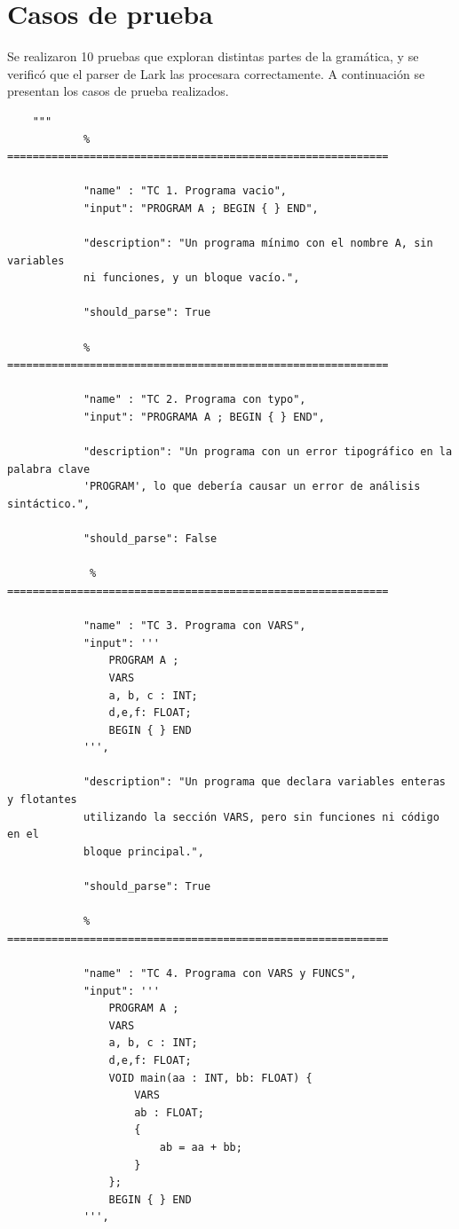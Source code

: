 \documentclass[12pt, letterpaper]{article}
\theoremstyle{definition}
\begin{document}
\section{Casos de prueba}
Se realizaron 10 pruebas que exploran distintas partes de la gramática, y se verificó que el parser de Lark las procesara correctamente. A continuación se presentan los casos de prueba realizados.
\begin{verbatim}
    """ 
            % ============================================================

            "name" : "TC 1. Programa vacio",
            "input": "PROGRAM A ; BEGIN { } END",
           
            "description": "Un programa mínimo con el nombre A, sin variables
            ni funciones, y un bloque vacío.",
           
            "should_parse": True
        
            % ============================================================

            "name" : "TC 2. Programa con typo",
            "input": "PROGRAMA A ; BEGIN { } END",
           
            "description": "Un programa con un error tipográfico en la palabra clave
            'PROGRAM', lo que debería causar un error de análisis sintáctico.",
           
            "should_parse": False
        
             % ============================================================

            "name" : "TC 3. Programa con VARS",
            "input": '''
                PROGRAM A ;
                VARS 
                a, b, c : INT;
                d,e,f: FLOAT;
                BEGIN { } END
            ''',
            
            "description": "Un programa que declara variables enteras y flotantes
            utilizando la sección VARS, pero sin funciones ni código en el
            bloque principal.",
            
            "should_parse": True
     
            % ============================================================

            "name" : "TC 4. Programa con VARS y FUNCS",
            "input": '''
                PROGRAM A ;
                VARS 
                a, b, c : INT;
                d,e,f: FLOAT;
                VOID main(aa : INT, bb: FLOAT) {                    
                    VARS
                    ab : FLOAT;
                    {                        
                        ab = aa + bb;
                    }
                };
                BEGIN { } END
            ''',
           

\end{verbatim}
\end{document}
